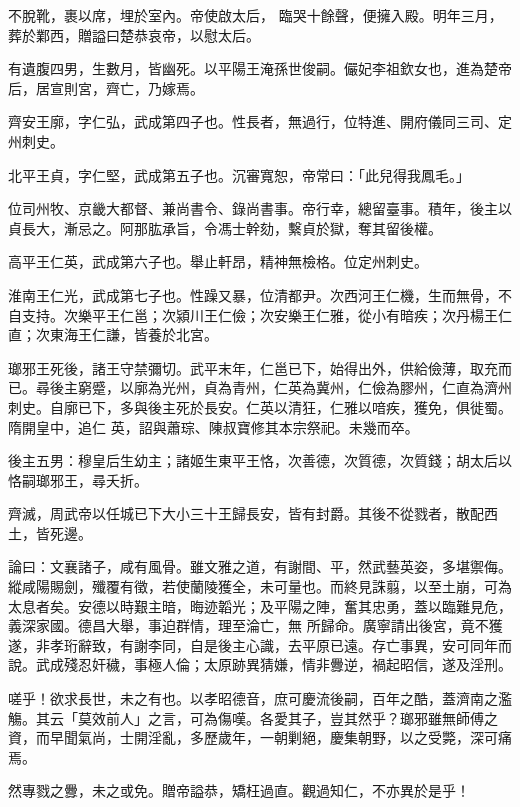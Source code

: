 \begin{pinyinscope}
 不脫靴，裹以席，埋於室內。帝使啟太后，
 臨哭十餘聲，便擁入殿。明年三月，葬於鄴西，贈謚曰楚恭哀帝，以慰太后。



 有遺腹四男，生數月，皆幽死。以平陽王淹孫世俊嗣。儼妃李祖欽女也，進為楚帝后，居宣則宮，齊亡，乃嫁焉。



 齊安王廓，字仁弘，武成第四子也。性長者，無過行，位特進、開府儀同三司、定州刺史。



 北平王貞，字仁堅，武成第五子也。沉審寬恕，帝常曰：「此兒得我鳳毛。」



 位司州牧、京畿大都督、兼尚書令、錄尚書事。帝行幸，總留臺事。積年，後主以貞長大，漸忌之。阿那肱承旨，令馮士幹劾，繫貞於獄，奪其留後權。



 高平王仁英，武成第六子也。舉止軒昂，精神無檢格。位定州刺史。



 淮南王仁光，武成第七子也。性躁又暴，位清都尹。次西河王仁機，生而無骨，不自支持。次樂平王仁邕；次潁川王仁儉；次安樂王仁雅，從小有暗疾；次丹楊王仁直；次東海王仁謙，皆養於北宮。



 瑯邪王死後，諸王守禁彌切。武平末年，仁邕已下，始得出外，供給儉薄，取充而已。尋後主窮蹙，以廓為光州，貞為青州，仁英為冀州，仁儉為膠州，仁直為濟州刺史。自廓已下，多與後主死於長安。仁英以清狂，仁雅以喑疾，獲免，俱徙蜀。隋開皇中，追仁
 英，詔與蕭琮、陳叔寶修其本宗祭祀。未幾而卒。



 後主五男：穆皇后生幼主；諸姬生東平王恪，次善德，次質德，次質錢；胡太后以恪嗣瑯邪王，尋夭折。



 齊滅，周武帝以任城已下大小三十王歸長安，皆有封爵。其後不從戮者，散配西土，皆死邊。



 論曰：文襄諸子，咸有風骨。雖文雅之道，有謝間、平，然武藝英姿，多堪禦侮。縱咸陽賜劍，殲覆有徵，若使蘭陵獲全，未可量也。而終見誅翦，以至土崩，可為太息者矣。安德以時艱主暗，晦迹韜光；及平陽之陣，奮其忠勇，蓋以臨難見危，義深家國。德昌大舉，事迫群情，理至淪亡，無
 所歸命。廣寧請出後宮，竟不獲遂，非孝珩辭致，有謝李同，自是後主心識，去平原已遠。存亡事異，安可同年而說。武成殘忍奸穢，事極人倫；太原跡異猜嫌，情非釁逆，禍起昭信，遂及淫刑。



 嗟乎！欲求長世，未之有也。以孝昭德音，庶可慶流後嗣，百年之酷，蓋濟南之濫觴。其云「莫效前人」之言，可為傷嘆。各愛其子，豈其然乎？瑯邪雖無師傅之資，而早聞氣尚，士開淫亂，多歷歲年，一朝剿絕，慶集朝野，以之受斃，深可痛焉。



 然專戮之釁，未之或免。贈帝謚恭，矯枉過直。觀過知仁，不亦異於是乎！



\end{pinyinscope}